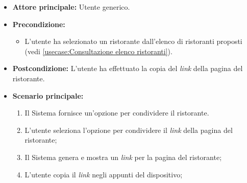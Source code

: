 \label{usecase:Condivisione link del ristorante}
\begin{itemize}
    \item \textbf{Attore principale:} Utente generico.


	\item \textbf{Precondizione:}
	\begin{itemize}
		\item L'utente ha selezionato un ristorante dall'elenco di ristoranti proposti (vedi \autoref{usecase:Consultazione elenco ristoranti}).
	\end{itemize}

	\item \textbf{Postcondizione:}
	      L'utente ha effettuato la copia del \textit{link} della pagina del ristorante.

	\item \textbf{Scenario principale:}
	      \begin{enumerate}
			  \item Il Sistema fornisce un'opzione per condividere il ristorante.
			  \item L'utente seleziona l'opzione per condividere il \textit{link} della pagina del ristorante;
		      \item Il Sistema genera e mostra un \textit{link} per la pagina del ristorante;
		      \item L'utente copia il \textit{link} negli appunti del dispositivo;
	      \end{enumerate}
\end{itemize}
